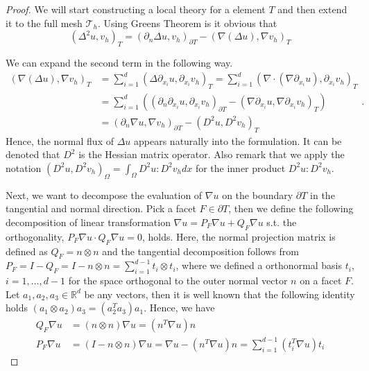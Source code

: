 \begin{proof}

 We will start constructing a local theory for a element $T$ and then extend it to the full mesh
$\mathcal{T}_{h} $. Using Greens Theorem is it obvious that
\begin{equation}
    \label{eq:id1}
\left( \Delta ^2 u,v_h \right) _{T }   = \left( \partial _{n} \Delta u, v_h \right) _{\partial T  } - \left( \nabla \left( \Delta  u \right) , \nabla v_h \right) _{T }
\end{equation}

We can expand the second term in the following way.
\begin{equation}
    \label{eq:id2}
    \begin{split}
( \nabla ( \Delta u ) , \nabla v_h ) _{T } & = \sum_{i = 1}^{ d}  ( \Delta  \partial _{x_{i}} u, \partial _{x_{i}}v_h ) _{T }
                                           = \sum_{i = 1}^{d}  ( \nabla \cdot ( \nabla \partial _{x_{i}} u ) , \partial _{x_{i}} v_h )_{T }  \\
&= \sum_{i = 1}^{d}  \left( ( \partial_n  \partial _{x_{i}} u,  \partial _{x_{i}} v_h ) _{\partial T } -   ( \nabla \partial _{x_{i}} u, \nabla \partial _{x_{i}} v_h )_{T } \right) \\
& = (  \partial_n\nabla u, \nabla v_h ) _{\partial_{} T  } - ( D^2 u, D^2v_h ) _{T }
    \end{split}
.\end{equation}
Hence, the normal flux of $\Delta u$ appears naturally into the formulation. It can be denoted that $D^2$ is the Hessian matrix operator. Also remark that we apply the notation
$( D^2u, D^2v_h )_{\Omega } = \int_{\Omega }^{} D^{2}u : D^2v_h  dx$ for the inner product $D^2u:D^2v_h$.

Next, we want to decompose the evaluation of $\nabla  u $ on the boundary $\partial T$ in the tangential and normal direction. Pick a facet  $F \in \partial T$, then we define the following decomposition of linear transformation $\nabla u = P_{F}\nabla u  + Q_{F}  \nabla u  $ s.t. the
orthogonality, $
P_{F} \nabla u  \cdot Q_{F}  \nabla u = 0$, holds. Here, the normal projection matrix is defined as $Q_{F} = n \otimes n $ and the tangential decomposition follows from $ P_{F} = I - Q_{F} = I - n \otimes n  =  \sum_{i=1}^{d-1} t_{i} \otimes t_i$,
where we defined a orthonormal basis $t_{i}$, $i = 1, \ldots, d-1$ for the space orthogonal to the outer normal vector $n$ on a facet $F$. Let $ a_{1}, a_{2}, a_{3} \in \mathbb{R} ^{d}$ be any vectors, then it is well known that the following identity holds $ ( a_{1}
\otimes a_{2}  ) a_{3} = ( a_{2}^{T}  a_{3}) a_{1} $. Hence, we have
\begin{equation}
\label{eq:projection}
    \begin{split}
   Q_{F} \nabla u & = ( n \otimes n ) \nabla u =  (n^{T} \nabla u)n \\
   P_{F} \nabla u & =( I - n \otimes n ) \nabla u =   \nabla u  - (n^{T}  \nabla u)n =  \sum_{ i =1 }^{d-1} ( t_{i}^{T}  \nabla u ) t_{i}
    \end{split}
\end{equation}


\end{proof}
